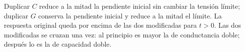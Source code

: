Duplicar \(C\) reduce a la mitad la pendiente inicial sin cambiar la tensión límite; duplicar \(G\) conserva la pendiente inicial y reduce a la mitad el límite. La respuesta original queda por encima de las dos modificadas para \(t>0\). Las dos modificadas se cruzan una vez: al principio es mayor la de conductancia doble; después lo es la de capacidad doble.
